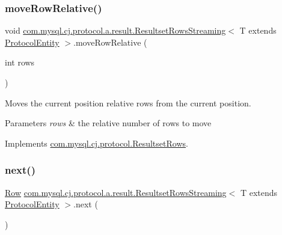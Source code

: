 \subsubsection{\texorpdfstring{move\+Row\+Relative()}{moveRowRelative()}}
{\footnotesize\ttfamily void \mbox{\hyperlink{classcom_1_1mysql_1_1cj_1_1protocol_1_1a_1_1result_1_1_resultset_rows_streaming}{com.\+mysql.\+cj.\+protocol.\+a.\+result.\+Resultset\+Rows\+Streaming}}$<$ T extends \mbox{\hyperlink{interfacecom_1_1mysql_1_1cj_1_1protocol_1_1_protocol_entity}{Protocol\+Entity}} $>$.move\+Row\+Relative (\begin{DoxyParamCaption}\item[{int}]{rows }\end{DoxyParamCaption})}

Moves the current position relative \textquotesingle{}rows\textquotesingle{} from the current position.


\begin{DoxyParams}{Parameters}
{\em rows} & the relative number of rows to move \\
\hline
\end{DoxyParams}


Implements \mbox{\hyperlink{interfacecom_1_1mysql_1_1cj_1_1protocol_1_1_resultset_rows_a81d7635ad38c59a3160e3edc46327bac}{com.\+mysql.\+cj.\+protocol.\+Resultset\+Rows}}.

\mbox{\label{classcom_1_1mysql_1_1cj_1_1protocol_1_1a_1_1result_1_1_resultset_rows_streaming_a2150a98917c9542a703991059ebd369f}} 
\subsubsection{\texorpdfstring{next()}{next()}}
{\footnotesize\ttfamily \mbox{\hyperlink{interfacecom_1_1mysql_1_1cj_1_1result_1_1_row}{Row}} \mbox{\hyperlink{classcom_1_1mysql_1_1cj_1_1protocol_1_1a_1_1result_1_1_resultset_rows_streaming}{com.\+mysql.\+cj.\+protocol.\+a.\+result.\+Resultset\+Rows\+Streaming}}$<$ T extends \mbox{\hyperlink{interfacecom_1_1mysql_1_1cj_1_1protocol_1_1_protocol_entity}{Protocol\+Entity}} $>$.next (\begin{DoxyParamCaption}{ }\end{DoxyParamCaption})}

